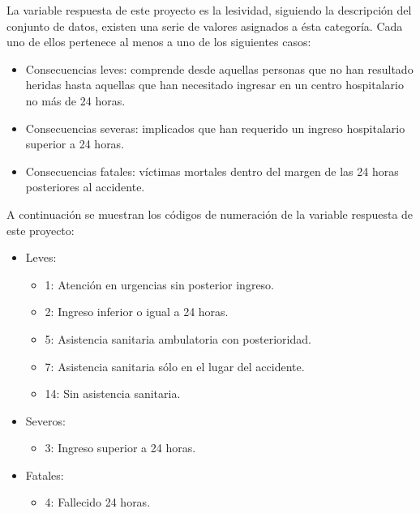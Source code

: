             La variable respuesta de este proyecto es la lesividad, siguiendo la descripción del conjunto de datos, existen una serie de valores asignados a ésta categoría. Cada uno de ellos pertenece al menos a uno de los siguientes casos:

              \begin{itemize}
                    \item Consecuencias leves: comprende desde aquellas personas que no han resultado heridas hasta aquellas que han necesitado ingresar en un centro hospitalario no más de 24 horas.
                    \item Consecuencias severas: implicados que han requerido un ingreso hospitalario superior a 24 horas.
                    \item Consecuencias fatales: víctimas mortales dentro del margen de las 24 horas posteriores al accidente.
                \end{itemize}


            A continuación se muestran los códigos de numeración de la variable respuesta de este proyecto:

              \begin{itemize}
                    \item Leves:
                        \begin{itemize}
                            \item 1: Atención en urgencias sin posterior ingreso.
                            \item 2: Ingreso inferior o igual a 24 horas.
                            \item 5: Asistencia sanitaria ambulatoria con posterioridad.
                            \item 7: Asistencia sanitaria sólo en el lugar del accidente.
                            \item 14: Sin asistencia sanitaria.
                        \end{itemize}
                    \item Severos:
                        \begin{itemize}
                            \item 3: Ingreso superior a 24 horas.
                        \end{itemize}
                    \item Fatales:
                        \begin{itemize}
                            \item 4: Fallecido 24 horas.
                        \end{itemize}
                \end{itemize}



